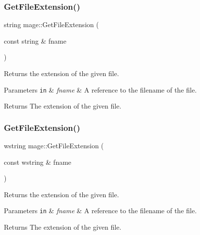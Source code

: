 \hypertarget{namespacemage_aec46035d0a6e15632a44ac88619fb675}{}\label{namespacemage_aec46035d0a6e15632a44ac88619fb675} 
\subsubsection{\texorpdfstring{Get\+File\+Extension()}{GetFileExtension()}\hspace{0.1cm}{\footnotesize\ttfamily [1/2]}}
{\footnotesize\ttfamily string mage\+::\+Get\+File\+Extension (\begin{DoxyParamCaption}\item[{const string \&}]{fname }\end{DoxyParamCaption})}

Returns the extension of the given file.


\begin{DoxyParams}[1]{Parameters}
\mbox{\tt in}  & {\em fname} & A reference to the filename of the file. \\
\hline
\end{DoxyParams}
\begin{DoxyReturn}{Returns}
The extension of the given file. 
\end{DoxyReturn}
\hypertarget{namespacemage_ac95841e5c563311d50ef3524d5b7a8d8}{}\label{namespacemage_ac95841e5c563311d50ef3524d5b7a8d8} 
\subsubsection{\texorpdfstring{Get\+File\+Extension()}{GetFileExtension()}\hspace{0.1cm}{\footnotesize\ttfamily [2/2]}}
{\footnotesize\ttfamily wstring mage\+::\+Get\+File\+Extension (\begin{DoxyParamCaption}\item[{const wstring \&}]{fname }\end{DoxyParamCaption})}

Returns the extension of the given file.


\begin{DoxyParams}[1]{Parameters}
\mbox{\tt in}  & {\em fname} & A reference to the filename of the file. \\
\hline
\end{DoxyParams}
\begin{DoxyReturn}{Returns}
The extension of the given file. 
\end{DoxyReturn}
\hypertarget{namespacemage_a74d063f352449eb92ca6d5faabb2f3cf}{}\label{namespacemage_a74d063f352449eb92ca6d5faabb2f3cf} 
